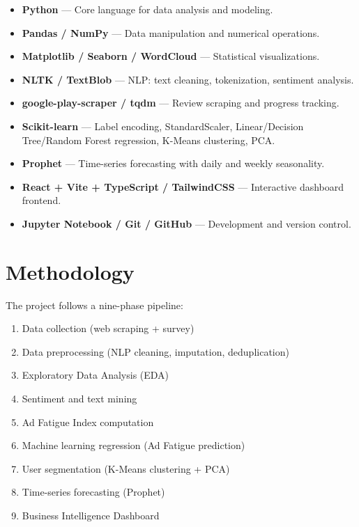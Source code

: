 \documentclass[12pt]{article}
\begin{document}
\begin{itemize}
    \item \textbf{Python} — Core language for data analysis and modeling.
    \item \textbf{Pandas / NumPy} — Data manipulation and numerical operations.
    \item \textbf{Matplotlib / Seaborn / WordCloud} — Statistical visualizations.
    \item \textbf{NLTK / TextBlob} — NLP: text cleaning, tokenization, sentiment analysis.
    \item \textbf{google-play-scraper / tqdm} — Review scraping and progress tracking.
    \item \textbf{Scikit-learn} — Label encoding, StandardScaler, Linear/Decision Tree/Random Forest regression, K-Means clustering, PCA.
    \item \textbf{Prophet} — Time-series forecasting with daily and weekly seasonality.
    \item \textbf{React + Vite + TypeScript / TailwindCSS} — Interactive dashboard frontend.
    \item \textbf{Jupyter Notebook / Git / GitHub} — Development and version control.
\end{itemize}

\section{Methodology}

The project follows a nine-phase pipeline:
\begin{enumerate}
    \item Data collection (web scraping + survey)
    \item Data preprocessing (NLP cleaning, imputation, deduplication)
    \item Exploratory Data Analysis (EDA)
    \item Sentiment and text mining
    \item Ad Fatigue Index computation
    \item Machine learning regression (Ad Fatigue prediction)
    \item User segmentation (K-Means clustering + PCA)
    \item Time-series forecasting (Prophet)
    \item Business Intelligence Dashboard
\end{enumerate}
\end{document}
